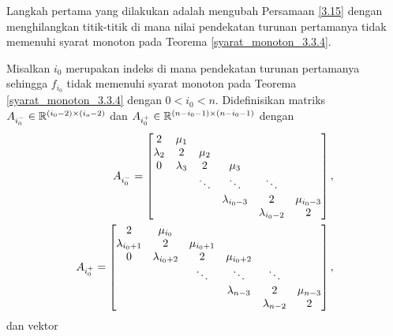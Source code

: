 Langkah pertama yang dilakukan adalah mengubah Persamaan \eqref{3.15} dengan menghilangkan titik-titik di mana nilai pendekatan turunan pertamanya tidak memenuhi syarat monoton pada Teorema \ref{syarat_monoton_3.3.4}.

Misalkan $i_0$ merupakan indeks di mana pendekatan turunan pertamanya sehingga $f_{i_0}$ tidak memenuhi syarat monoton pada Teorema \ref{syarat_monoton_3.3.4} dengan $0 < i_0 < n$. Didefinisikan matriks $A_{i_0^-} \in \mathbb{R}^{(i_0 - 2)\times(i_o - 2)}$ dan $A_{i_0^+} \in \mathbb{R}^{(n-i_0-1)\times(n-i_0-1)}$ dengan
\begin{align}\label{splReg1}
    A_{i_0^-}=
    \begin{bmatrix}
        2 & \mu_1 & & & &\\
        \lambda_2 & 2 & \mu_2 & & &\\
        0 & \lambda_3 & 2 & \mu_3 & &\\
        & & \ddots & \ddots & \ddots &\\
        & & & \lambda_{i_0 - 3} & 2 & \mu_{i_0 - 3}\\
        & & & & \lambda_{i_0-2} & 2
    \end{bmatrix},\notag \\
    A_{i_0^+}=
    \begin{bmatrix}
        2 & \mu_{i_0} & & & &\\
        \lambda_{i_0+1} & 2 & \mu_{i_0+1} & & &\\
        0 & \lambda_{i_0+2} & 2 & \mu_{i_0+2} & &\\
        & & \ddots & \ddots & \ddots &\\
        & & & \lambda_{n - 3} & 2 & \mu_{n - 3}\\
        & & & & \lambda_{n-2} & 2
    \end{bmatrix},
\end{align}
dan vektor
